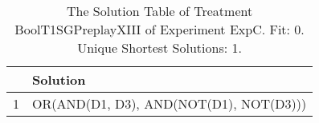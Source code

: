\begin{table}[ht]
\centering
\begin{tabular}{rp{9cm}}
  \hline
 & Solution \\ 
  \hline
1 & OR(AND(D1, D3), AND(NOT(D1), NOT(D3))) \\ 
   \hline
\end{tabular}
\caption{The Solution Table of Treatment BoolT1SGPreplayXIII of Experiment ExpC. Fit: 0. Unique Shortest Solutions: 1.} 
\end{table}
